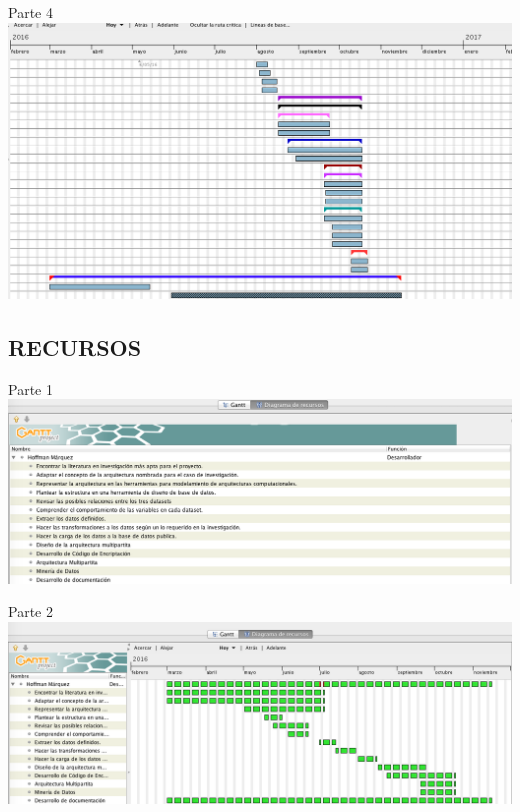 \documentclass[a4paper, 11pt, oneside]{article}
\theoremstyle{definition}
\theoremstyle{remark}
\begin{document}
\begin{table}
\begin{center}
Parte 4
\includegraphics[width=\textwidth]{Imagen4.png}
\end{center}
\end{table}
\clearpage

\begin{table}
\begin{center}
\section{RECURSOS}
\end{center}
\begin{center}
Parte 1
\includegraphics[width=\textwidth]{Hoffman1.png}
\end{center}
\end{table}
\clearpage

\begin{table}
\begin{center}
Parte 2
\includegraphics[width=\textwidth]{Hoffma2.png}
\end{center}
\end{table}
\clearpage
\end{document}
